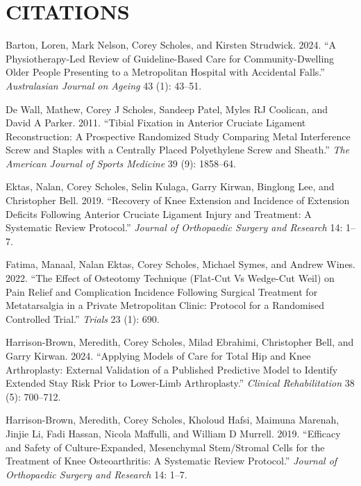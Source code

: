 \documentclass[
  letterpaper,
  DIV=11,
  numbers=noendperiod]{scrartcl}
\newlength{\cslhangindent}
\newenvironment{CSLReferences}[2] %
 {\begin{list}{}{%
  \setlength{\itemindent}{0pt}
  \setlength{\leftmargin}{0pt}
  \setlength{\parsep}{0pt}
  \ifodd #1
   \setlength{\leftmargin}{\cslhangindent}
   \setlength{\itemindent}{-1\cslhangindent}
  \fi
  \setlength{\itemsep}{#2\baselineskip}}}
 {\end{list}}
\begin{document}
\section*{CITATIONS}\label{citations}

\label{refs}
\begin{CSLReferences}{1}{0}
Barton, Loren, Mark Nelson, Corey Scholes, and Kirsten Strudwick. 2024.
{``A Physiotherapy-Led Review of Guideline-Based Care for
Community-Dwelling Older People Presenting to a Metropolitan Hospital
with Accidental Falls.''} \emph{Australasian Journal on Ageing} 43 (1):
43--51.

De Wall, Mathew, Corey J Scholes, Sandeep Patel, Myles RJ Coolican, and
David A Parker. 2011. {``Tibial Fixation in Anterior Cruciate Ligament
Reconstruction: A Prospective Randomized Study Comparing Metal
Interference Screw and Staples with a Centrally Placed Polyethylene
Screw and Sheath.''} \emph{The American Journal of Sports Medicine} 39
(9): 1858--64.

Ektas, Nalan, Corey Scholes, Selin Kulaga, Garry Kirwan, Binglong Lee,
and Christopher Bell. 2019. {``Recovery of Knee Extension and Incidence
of Extension Deficits Following Anterior Cruciate Ligament Injury and
Treatment: A Systematic Review Protocol.''} \emph{Journal of Orthopaedic
Surgery and Research} 14: 1--7.

Fatima, Manaal, Nalan Ektas, Corey Scholes, Michael Symes, and Andrew
Wines. 2022. {``The Effect of Osteotomy Technique (Flat-Cut Vs Wedge-Cut
Weil) on Pain Relief and Complication Incidence Following Surgical
Treatment for Metatarsalgia in a Private Metropolitan Clinic: Protocol
for a Randomised Controlled Trial.''} \emph{Trials} 23 (1): 690.

Harrison-Brown, Meredith, Corey Scholes, Milad Ebrahimi, Christopher
Bell, and Garry Kirwan. 2024. {``Applying Models of Care for Total Hip
and Knee Arthroplasty: External Validation of a Published Predictive
Model to Identify Extended Stay Risk Prior to Lower-Limb
Arthroplasty.''} \emph{Clinical Rehabilitation} 38 (5): 700--712.

Harrison-Brown, Meredith, Corey Scholes, Kholoud Hafsi, Maimuna Marenah,
Jinjie Li, Fadi Hassan, Nicola Maffulli, and William D Murrell. 2019.
{``Efficacy and Safety of Culture-Expanded, Mesenchymal Stem/Stromal
Cells for the Treatment of Knee Osteoarthritis: A Systematic Review
Protocol.''} \emph{Journal of Orthopaedic Surgery and Research} 14:
1--7.


\end{CSLReferences}
\end{document}
